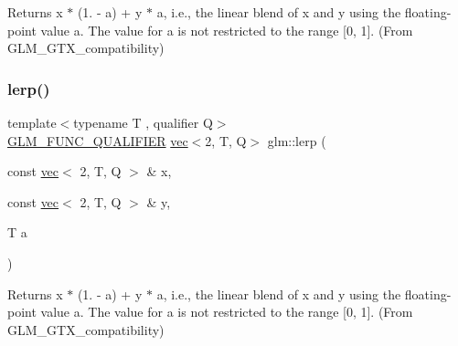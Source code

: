 Returns x $\ast$ (1. -\/ a) + y $\ast$ a, i.\+e., the linear blend of x and y using the floating-\/point value a. The value for a is not restricted to the range \mbox{[}0, 1\mbox{]}. (From G\+L\+M\+\_\+\+G\+T\+X\+\_\+compatibility) 

\mbox{\label{group__gtx__compatibility_gaa551c0a0e16d2d4608e49f7696df897f}} 
\subsubsection{\texorpdfstring{lerp()}{lerp()}\hspace{0.1cm}{\footnotesize\ttfamily [2/7]}}
{\footnotesize\ttfamily template$<$typename T , qualifier Q$>$ \\
\hyperlink{setup_8hpp_a33fdea6f91c5f834105f7415e2a64407}{G\+L\+M\+\_\+\+F\+U\+N\+C\+\_\+\+Q\+U\+A\+L\+I\+F\+I\+ER} \hyperlink{structglm_1_1vec}{vec}$<$2, T, Q$>$ glm\+::lerp (\begin{DoxyParamCaption}\item[{const \hyperlink{structglm_1_1vec}{vec}$<$ 2, T, Q $>$ \&}]{x,  }\item[{const \hyperlink{structglm_1_1vec}{vec}$<$ 2, T, Q $>$ \&}]{y,  }\item[{T}]{a }\end{DoxyParamCaption})}



Returns x $\ast$ (1. -\/ a) + y $\ast$ a, i.\+e., the linear blend of x and y using the floating-\/point value a. The value for a is not restricted to the range \mbox{[}0, 1\mbox{]}. (From G\+L\+M\+\_\+\+G\+T\+X\+\_\+compatibility) 

\mbox{\label{group__gtx__compatibility_ga44a8b5fd776320f1713413dec959b32a}} 

